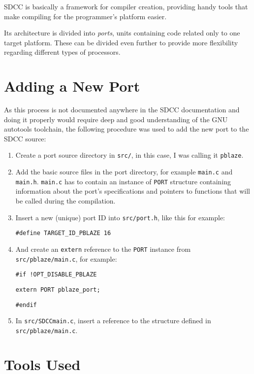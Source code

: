 SDCC is basically a framework for compiler creation, providing handy tools that make compiling for the programmer's platform easier.

Its architecture is divided into \emph{ports}, units containing code related only to one target platform. These can be divided even further to provide more flexibility regarding different types of processors.

    \section{Adding a New Port}

    As this process is not documented anywhere in the SDCC documentation and doing it properly would require deep and good understanding of the GNU autotools toolchain, the following procedure was used to add the new port to the SDCC source:

    \begin{enumerate}

    \item Create a port source directory in \texttt{src/}, in this case, I was calling it \texttt{pblaze}.

    \item Add the basic source files in the port directory, for example \texttt{main.c} and \texttt{main.h}. \texttt{main.c} has to contain an instance of \texttt{PORT} structure containing information about the port's specifications and pointers to functions that will be called during the compilation.

    \item Insert a new (unique) port ID into \texttt{src/port.h}, like this for example:

    \texttt{\#define TARGET\_ID\_PBLAZE    16}

    \item And create an \texttt{extern} reference to the \texttt{PORT} instance from \texttt{src/pblaze/main.c}, for example:

    \texttt{\#if !OPT\_DISABLE\_PBLAZE}

    \texttt{extern PORT pblaze\_port;}

    \texttt{\#endif}

    \item In \texttt{src/SDCCmain.c}, insert a reference to the structure defined in \texttt{src/pblaze/main.c}.

    \end{enumerate}

    \section{Tools Used}

